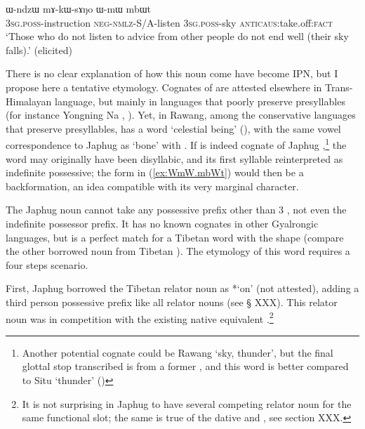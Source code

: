 \begin{exe}
\ex  \label{ex:WmW.mbWt}
\gll  ɯ-ndzɯ mɤ-kɯ-sɤŋo ɯ-mɯ mbɯt  \\
\textsc{3sg.poss}-instruction \textsc{neg}-\textsc{nmlz}-S/A-listen \textsc{3sg.poss}-sky \textsc{anticaus}:take.off:\textsc{fact} \\
\glt `Those who do not listen to advice from other people do not end well (their sky falls).' (elicited)
\end{exe}
There is no clear explanation of how this noun come have become IPN, but I propose here a tentative etymology. Cognates of  are attested elsewhere in Trans-Himalayan language, but mainly in languages that poorly preserve presyllables (for instance Yongning Na , \citealt[132]{michaud17yongning}). Yet, in Rawang, among the conservative languages that preserve presyllables, has a word   `celestial being'  (\citealt[13]{lapolla01rawang}), with the same vowel correspondence to Japhug  as   `bone' with . If   is indeed cognate of Japhug ,\footnote{Another potential cognate could be Rawang   `sky, thunder', but the final glottal stop transcribed  is from a former , and this word is better compared to Situ  `thunder' (\citealt[73]{zhang16bragdbar})} the word may originally have been disyllabic, and its first syllable reinterpreted as indefinite possessive; the form  in (\ref{ex:WmW.mbWt}) would then be a backformation, an idea compatible with its very marginal character.

 
The Japhug noun  cannot take any possessive prefix other than 3\sg{} , not even the indefinite possessor prefix. It has no known cognates in other Gyalrongic languages, but is a perfect match for a Tibetan word with the shape  (compare the other borrowed noun  from Tibetan ). The etymology of this word requires a four steps scenario.

First, Japhug borrowed the Tibetan relator noun   as  *`on' (not attested), adding a third person possessive prefix like all relator nouns (see § XXX). This relator noun was in competition with the existing native equivalent .\footnote{It is not surprising in Japhug to have several competing relator noun for the same functional slot; the same is true of the dative  and , see section XXX. }
  
